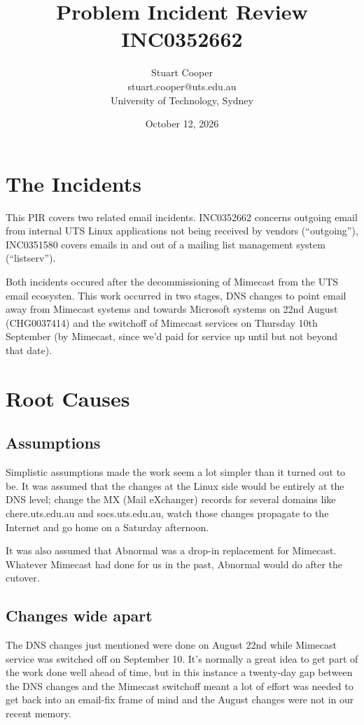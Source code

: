 \documentclass{article}
\title{Problem Incident Review INC0352662}
\author{Stuart Cooper\\stuart.cooper@uts.edu.au\\University of
  Technology, Sydney}
\date{October 12, 2026}
\begin{document}
\maketitle

\section{The Incidents}

This PIR covers two related email incidents. INC0352662 concerns
outgoing email from internal UTS Linux applications not being received
by vendors (``outgoing''), INC0351580 covers emails in and out of a
mailing list management system (``listserv'').

Both incidents occured after the decommissioning of Mimecast from the
UTS email ecosysten. This work occurred in two stages, DNS changes to
point email away from Mimecast systems and towards Microsoft systems
on 22nd August (CHG0037414) and the switchoff of Mimecast services on
Thursday 10th September (by Mimecast, since we'd paid for service up
until but not beyond that date).

\section{Root Causes}

\subsection{Assumptions}


Simplistic assumptions made the work seem a lot simpler than it turned
out to be. It was assumed that the changes at the Linux side would be
entirely at the DNS level; change the MX (Mail eXchanger) records for
several domains like chere.uts.edu.au and socs.uts.edu.au,
watch those changes propagate to the Internet and go home on a
Saturday afternoon.

It was also assumed that Abnormal was a drop-in replacement for
Mimecast. Whatever Mimecast had done for us in the past, Abnormal
would do after the cutover.

\subsection{Changes wide apart}

The DNS changes just mentioned were done on August 22nd while Mimecast
service was switched off on September 10. It's normally a great
idea to get part of the work done well ahead of time, but in this
instance a twenty-day gap between the DNS changes and the Mimecast
switchoff meant a lot of effort was needed to get back into an
email-fix frame of mind and the August changes were not in our recent
memory.
\end{document}
